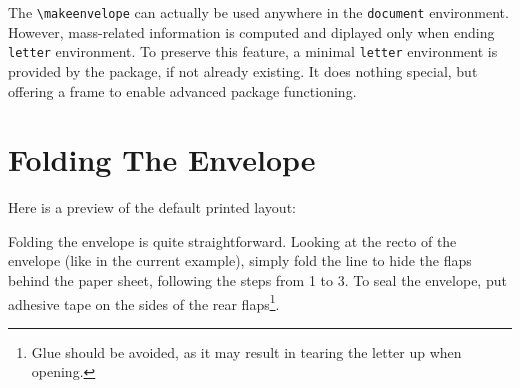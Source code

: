 \documentclass{article}
\begin{document}
		The \verb|\makeenvelope| can actually be used anywhere in the \verb|document| environment. However, mass-related information is computed and diplayed only when ending \verb|letter| environment. To preserve this feature, a minimal \verb|letter| environment is provided by the package, if not already existing. It does nothing special, but offering a frame to enable advanced package functioning.

	\clearpage

	\section{Folding The Envelope}
		Here is a preview of the default printed layout:

		\makeatletter

		\setlength{\el@l}{10.5cm}
		\setlength{\el@L}{14.85cm}

		\def\fromname{\small Sender Name}
		\def\fromaddress{\small Sender address\\00000 City S}

		\def\toname{\small Recipient Name}
		\def\toaddress{\small Recipient address\\00000 City R}


		\begin{center}
		\end{center}

		\makeatother

		Folding the envelope is quite straightforward. Looking at the recto of the envelope (like in the current example), simply fold the line to hide the flaps behind the paper sheet, following the steps from 1 to 3. To seal the envelope, put adhesive tape on the sides of the rear flaps\footnote{Glue should be avoided, as it may result in tearing the letter up when opening.}.
\end{document}
